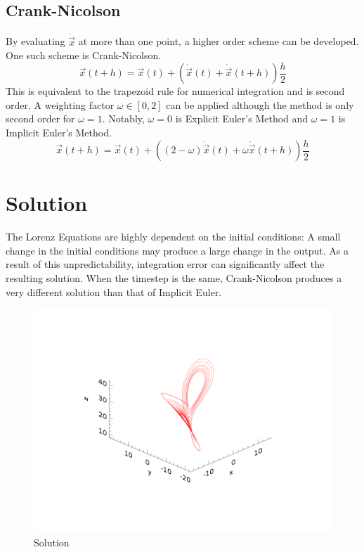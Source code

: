 \documentclass[12pt,twocolumn]{article}
\begin{document}
\subsection*{Crank-Nicolson}
By evaluating $\dot{\vec{x}}$ at more than one point, a higher order scheme can be developed.
One such scheme is Crank-Nicolson.
\begin{equation}
\vec{x}(t+h) = \vec{x}(t) + (\dot{\vec{x}}(t) + \dot{\vec{x}}(t+h))\frac{h}{2}
\end{equation}
This is equivalent to the trapezoid rule for numerical integration and is second order.
A weighting factor $\omega \in [0,2]$ can be applied although the method is only second order for $\omega = 1$.
Notably, $\omega = 0$ is Explicit Euler's Method and $\omega = 1$ is Implicit Euler's Method.
\begin{equation}
\vec{x}(t+h) = \vec{x}(t) + ((2-\omega)\dot{\vec{x}}(t) + \omega\dot{\vec{x}}(t+h))\frac{h}{2}
\end{equation}

\section*{Solution}
The Lorenz Equations are highly dependent on the initial conditions: A small change in the initial conditions may produce a large
change in the output. As a result of this unpredictability, integration error can significantly affect the resulting solution.
When the timestep is the same, Crank-Nicolson produces a very different solution than that of Implicit Euler.
\begin{figure}
\includegraphics[width=\columnwidth]{plots/3d_sol.png}
\footnotesize{\caption{Solution}}
\end{figure}
\end{document}
